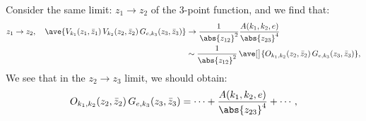 \documentclass[a4paper,10pt]{article}
\begin{document}
\begin{enumerate}
\begin{enumerate}
	Consider the same limit: $z_1 \to z_2$ of the 3-point function, and we find that:
	\begin{equation}
	\begin{aligned}
		z_1 \to z_2,\quad
		\ave{
			V_{k_1}(z_1,\bar{z}_1)\,
			V_{k_2}(z_2,\bar{z}_2)\,
			G_{e,k_3}(z_3,\bar{z}_3)
		}
		&\to \frac{1}{\abs{z_{12}}^2}
			\frac{A(k_1,k_2,e)}{
				\abs{z_{23}}^4
			} \\
		&\sim \frac{1}{\abs{z_{12}}^2}\,
			\ave[\big]{
				O_{k_1,k_2}(z_2,\bar{z}_2)\,
				G_{e,k_3}(z_3,\bar{z}_3)
			},
	\end{aligned}
	\end{equation}
	We see that in the $z_2\to z_3$ limit, we should obtain:
	\begin{equation}
		O_{k_1,k_2}(z_2,\bar{z}_2)\,
		G_{e,k_3}(z_3,\bar{z}_3)
		= \cdots
			+ \frac{A(k_1,k_2,e)}{
				\abs{z_{23}}^4
			}
			+ \cdots,
	\end{equation}
	

\end{enumerate}
\end{enumerate}
\end{document}
